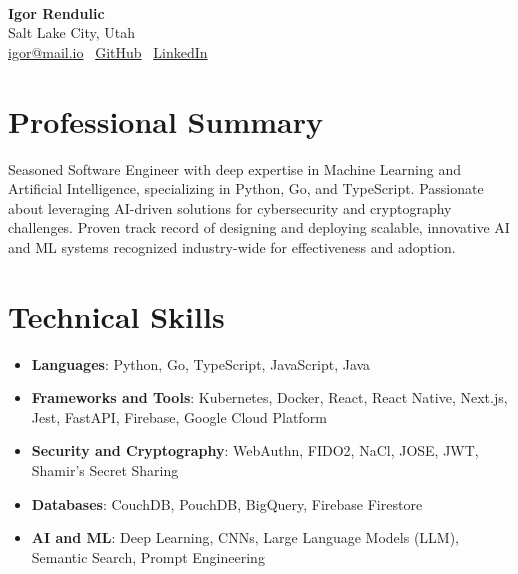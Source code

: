 \documentclass[11pt]{article}
\begin{document}
\begin{center}
  \\[1em]
  {\LARGE\bfseries Igor Rendulic}\\
  Salt Lake City, Utah\\
  \href{mailto:igor@mail.io}{igor@mail.io} \textbar\ 
  \href{https://github.com/igorrendulic}{GitHub} \textbar\ 
  \href{https://www.linkedin.com/in/igorrendulic}{LinkedIn}
\end{center}

\section*{Professional Summary}
Seasoned Software Engineer with deep expertise in Machine Learning and Artificial Intelligence, specializing in Python, Go, and TypeScript. Passionate about leveraging AI-driven solutions for cybersecurity and cryptography challenges. Proven track record of designing and deploying scalable, innovative AI and ML systems recognized industry-wide for effectiveness and adoption.

\section*{Technical Skills}
\begin{itemize}
    \item \textbf{Languages}: Python, Go, TypeScript, JavaScript, Java
    \item \textbf{Frameworks and Tools}: Kubernetes, Docker, React, React Native, Next.js, Jest, FastAPI, Firebase, Google Cloud Platform
    \item \textbf{Security and Cryptography}: WebAuthn, FIDO2, NaCl, JOSE, JWT, Shamir's Secret Sharing
    \item \textbf{Databases}: CouchDB, PouchDB, BigQuery, Firebase Firestore
    \item \textbf{AI and ML}: Deep Learning, CNNs, Large Language Models (LLM), Semantic Search, Prompt Engineering
\end{itemize}
\end{document}
